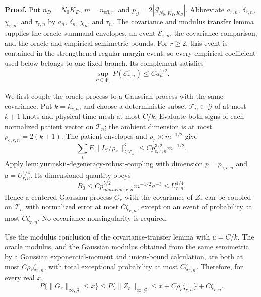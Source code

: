 \textbf{Proof.}
Put \(n_D=N_0K_D\), \(m=n_{\mathrm{eff},r}\), and
\(p_{\mathcal G}=2|\mathcal G_{N_0,K_T,K_D}|\).  Abbreviate
\(a_{r,n}\), \(\delta_{r,n}\), \(\chi_{r,n}\), and \(\tau_{r,n}\) by
\(a_n\), \(\delta_n\), \(\chi_n\), and \(\tau_n\).  The covariance and
modulus transfer lemma supplies the oracle summand envelopes, an event
\(\mathcal E_{r,n}\), the covariance comparison, and the oracle and empirical
semimetric bounds.  For \(r\ge2\), this event is contained in the strengthened
regular-margin event, so every empirical coefficient used below belongs to one
fixed branch.  Its complement satisfies
\[
 \sup_{P\in\mathfrak P_r}P(\mathcal E_{r,n}^c)
 \le Ca_n^{1/2}.                                        \tag{1}
\]

We first couple the oracle process to a Gaussian process with the same
covariance.  Put \(k=k_{r,n}\), and choose a deterministic subset
\(\mathcal T_n\subset\mathcal G\) of at most \(k+1\) knots and physical-time
mesh at most \(C/k\).  Evaluate both signs of each normalized patient vector
on \(\mathcal T_n\); the ambient dimension is at most
\(p_{\mathrm c,r,n}=2(k+1)\).  The patient envelopes and
\(\rho_r\asymp m^{-1/2}\) give
\[
 \sum_iE\|L_i/\rho_r\|_{2,\mathcal T_n}^3
 \le Cp_{\mathrm c,r,n}^{3/2}m^{-1/2}.                  \tag{2}
\]
Apply \(\mathrm{lem:yurinskii\mbox{-}degeneracy\mbox{-}robust\mbox{-}coupling}\)
with dimension \(p=p_{\mathrm c,r,n}\) and
\(a=U_{r,n}^{1/4}\).  Its dimensioned quantity obeys
\[
 B_0\le Cp_{mathrm c,r,n}^{5/2}m^{-1/2}a^{-3}
 \le U_{r,n}^{1/4}.                                     \tag{3}
\]
Hence a centered Gaussian process \(G_r\) with the covariance of \(Z_r\) can
be coupled on \(\mathcal T_n\) with normalized error at most
\(C\zeta_{r,n}\), except on an event of probability at most
\(C\zeta_{r,n}\).  No covariance nonsingularity is required.

Use the modulus conclusion of the covariance-transfer lemma with \(u=C/k\).
The oracle modulus, and the Gaussian modulus obtained from the same
semimetric by a Gaussian exponential-moment and union-bound calculation, are
both at most \(C\rho_r\zeta_{r,n}\), with total exceptional probability at
most \(C\zeta_{r,n}\).  Therefore, for every real \(x\),
\[
 P\{\|G_r\|_{\infty,\mathcal G}\le x\}
 \le P\{\|Z_r\|_{\infty,\mathcal G}
 \le x+C\rho_r\zeta_{r,n}\}+C\zeta_{r,n}.              \tag{4}
\]

